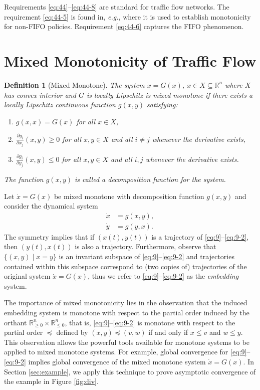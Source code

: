 \documentclass[letterpaper, 10 pt, conference]{ieeeconf}
\newtheorem{definition}{Definition}
\begin{document}
Requirements \ref{eq:44}--\ref{eq:44-8} are standard for traffic flow networks. The requirement \ref{eq:44-5} is found in, \emph{e.g.}, \cite[Definition 2]{Como:2015ne} where it is used to establish monotonicity for non-FIFO policies. Requirement \ref{eq:44-6} captures the FIFO phenomenon.





\section{Mixed Monotonicity of Traffic Flow}
\label{sec:mixed-monot-traff}
\begin{definition}[Mixed Monotone]
\label{def:cwmm}
The system $\dot{x}=G(x)$, $x\in X\subseteq \mathbb{R}^n$ where $X$ has convex interior and $G$ is locally Lipschitz is \emph{mixed monotone} if there exists a locally Lipschitz continuous function $g(x,y)$ satisfying:
\begin{enumerate}
\item $g(x,x)=G(x)$ for all $x\in X$,\\
\item $\displaystyle \frac{\partial g_i}{\partial x_j} (x,y)\geq 0$ for all $x,y\in X$ and all  $i\neq j$ whenever the derivative exists,\\
\item $\displaystyle \frac{\partial g_i}{\partial y_j} (x,y)\leq 0$ for all $x,y\in X$ and all  $i,  j$ whenever the derivative exists.
\end{enumerate}
The function $g(x,y)$ is called a \emph{decomposition function} for the system.
\end{definition}


Let $\dot{x}=G(x)$ be mixed monotone with decomposition function $g(x,y)$ and consider the dynamical system
\begin{align}
  \label{eq:9}
  \dot{x}&=g(x,y),\\
  \label{eq:9-2} \dot{y}&=g(y,x).
\end{align}
The symmetry implies that if $(x(t),y(t))$ is a trajectory of \eqref{eq:9}--\eqref{eq:9-2}, then $(y(t),x(t))$ is also a trajectory.  Furthermore, observe that $\{(x,y)\mid x=y\}$ is an invariant subspace of \eqref{eq:9}--\eqref{eq:9-2} and trajectories contained within this subspace correspond to (two copies of) trajectories of the original system $\dot{x}=G(x)$, thus we refer to \eqref{eq:9}--\eqref{eq:9-2} as the \emph{embedding} system.


The importance of mixed monotonicity lies in the observation that the induced embedding system is monotone with respect to the partial order induced by the orthant $\mathbb{R}_{\geq 0}^n\times \mathbb{R}_{\leq 0}^n$, that is, \eqref{eq:9}--\eqref{eq:9-2}  is monotone with respect to the partial order $\preceq$ defined by $(x,y)\preceq (v,w)$ if and only if $x\leq v$ and $w\leq y$. This observation allows the powerful tools available for monotone systems to be applied to mixed monotone systems. For example, global convergence for \eqref{eq:9}--\eqref{eq:9-2} implies global convergence of the mixed monotone system $\dot{x}=G(x)$. In Section \ref{sec:example}, we apply this technique to prove asymptotic convergence of the example in Figure \ref{fig:div}.
\end{document}

